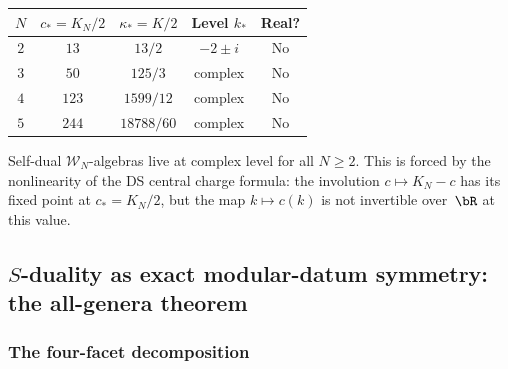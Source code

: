 \begin{computation}
\label{comp:thqg-IV-self-dual-data}
\renewcommand{\arraystretch}{1.4}
\begin{center}
\begin{tabular}{ccccc}
\toprule
$N$ & $c_* = K_N/2$ & $\kappa_* = K/2$ & Level $k_*$ & Real? \\
\midrule
$2$ & $13$ & $13/2$ & $-2 \pm i$ & No \\
$3$ & $50$ & $125/3$ & complex & No \\
$4$ & $123$ & $1599/12$ & complex & No \\
$5$ & $244$ & $18788/60$ & complex & No \\
\bottomrule
\end{tabular}
\end{center}
Self-dual $\mathcal{W}_N$-algebras live at complex level for all
$N \geq 2$. This is forced by the nonlinearity of the DS central
charge formula: the involution $c \mapsto K_N - c$ has its fixed
point at $c_* = K_N/2$, but the map $k \mapsto c(k)$ is not
invertible over~$\bR$ at this value.
\end{computation}

%
%

\subsection{$S$-duality as exact modular-datum symmetry: the all-genera theorem}
\label{subsec:thqg-IV-s-duality-exact}

\subsubsection{The four-facet decomposition}

